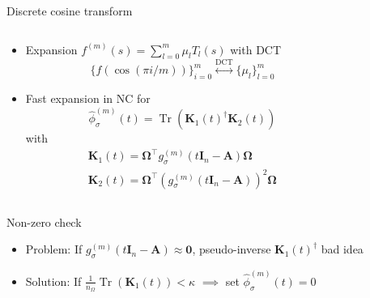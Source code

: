 \documentclass[aspectratio=169, leqno, 12pt]{beamer}
\newcommand{\mtx}[1]{\boldsymbol{#1}}
\DeclareMathOperator{\Tr}{Tr}
\DeclareMathOperator{\DCT}{DCT}
\begin{document}
\begin{frame}{Discrete cosine transform}
    \begin{columns}
        \begin{column}{0.55\textwidth}
            \begin{itemize}
                \item Expansion $f^{(m)}(s) = \sum_{l=0}^m \mu_l T_l(s)$
                with \gls{DCT}
                \begin{equation}
                    \big\{ f(\cos(\pi i / m)) \big\}_{i=0}^m \stackrel{\DCT}{\longleftrightarrow} \{ \mu_l \}_{l=0}^m 
                \end{equation}
                \item Fast expansion in \gls{NC} for
                \begin{equation}
                    \widehat{\phi}_{\sigma}^{(m)}(t) = \Tr(\mtx{K}_1(t)^{\dagger} \mtx{K}_2(t))
                \end{equation}
                with
                \begin{align}
                    \mtx{K}_1(t) = \mtx{\Omega}^{\top} g_{\sigma}^{(m)}(t\mtx{I}_n - \mtx{A}) \mtx{\Omega} \\
                    \mtx{K}_2(t) = \mtx{\Omega}^{\top} (g_{\sigma}^{(m)}(t\mtx{I}_n - \mtx{A}))^2 \mtx{\Omega}
                \end{align}
            \end{itemize}
        \end{column}
        \begin{column}{0.45\textwidth}
            \scalebox{0.65}{}
        \end{column}
    \end{columns}
\end{frame}

\begin{frame}{Non-zero check}
    \begin{itemize}
        \item Problem: If $g_{\sigma}^{(m)}(t\mtx{I}_n - \mtx{A}) \approx \mtx{0}$, pseudo-inverse $\mtx{K}_1(t)^{\dagger}$ bad idea
        \item Solution: If $\frac{1}{n_{\Omega}} \Tr(\mtx{K}_1(t)) < \kappa$ $\implies$ set $\widehat{\phi}_{\sigma}^{(m)}(t) = 0$
    \end{itemize}
    \centering
    \scalebox{0.8}{}
\end{frame}
\end{document}

